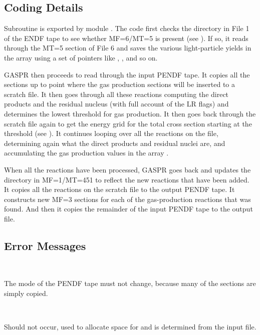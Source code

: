 \subsection{Coding Details}
\label{ssGASPR_details}

Subroutine  is exported by module
. The code
first checks the directory in File 1 of the ENDF tape to
see whether MF=6/MT=5 is present (see ).  If so, it
reads through the MT=5 section of File 6 and saves the various
light-particle yields in the array  using a set of pointers
like , , and so on.

GASPR then proceeds to read through the input PENDF tape.  It copies all
the sections up to point where the gas production sections will be
inserted to a scratch file.  It then goes through all these reactions
computing the direct products and the residual nucleus (with full
account of the LR flags) and determines the lowest threshold for
gas production.  It then goes back through the scratch file again
to get the energy grid for the total cross section starting at the
threshold (see ).  It continues looping over all the
reactions on the file, determining again what the direct products
and residual nuclei are, and accumulating the gas production values
in the array .

When all the reactions have been processed, GASPR goes back and
updates the directory in MF=1/MT=451 to reflect the new reactions
that have been added.  It copies all the reactions on the scratch
file to the output PENDF tape.  It constructs new MF=3 sections
for each of the gas-production reactions that was found.  And
then it copies the remainder of the input PENDF tape to the output
file.

\subsection{Error Messages}
\label{ssGASPR_msg}

\begin{description}
\begin{singlespace}

\item[\cword{error in gaspr***npend and noutp must both be ...}] ~\par
   The mode of the PENDF tape must not change, because many of
   the sections are simply copied.

\item[\cword{error in gaspr***too many gas production energy points.}] ~\par
   Should not occur,  used to allocate space for 
   and  is determined from the input file.

\end{singlespace}
\end{description}

\cleardoublepage

